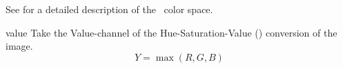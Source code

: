 \begin{codelist}
\begin{codelist}
    See  for a detailed description of the
    ~color space.

  \item[value]\itemend
    Take the Value-channel of the Hue-Saturation-Value () conversion of the image.
    \[
    Y = \max(R, G, B)
    \]
  \end{codelist}
\end{codelist}




